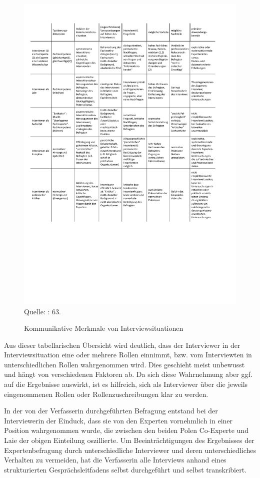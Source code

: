 \begin{figure}[H]
\centering
\caption{Kommunikative Merkmale von Interviewsituationen}
\includegraphics[width=7in,trim=50 220 0 50]{Material/InterviewsituationenDiss}
Quelle: \cite{bogmenz} : 63.
\end{figure}
Aus dieser tabellarischen Übersicht wird deutlich, dass der Interviewer in der Interviewsituation eine oder mehrere Rollen einnimmt, bzw. vom Interviewten in unterschiedlichen Rollen wahrgenommen wird. Dies geschieht meist unbewusst und hängt von verschiedenen Faktoren ab. Da sich diese Wahrnehmung aber ggf. auf die Ergebnisse auswirkt, ist es hilfreich, sich als Interviewer über die jeweils eingenommenen Rollen oder Rollenzuschreibungen klar zu werden. \par
In der von der Verfasserin durchgeführten Befragung entstand bei der Interviewerin der Einduck, dass sie von den Experten vornehmlich in einer Position wahrgenommen wurde, die zwischen den beiden Polen Co-Experte und Laie der obigen Einteilung oszillierte. Um Beeinträchtigungen des Ergebnisses der Expertenbefragung durch unterschiedliche Interviewer und deren unterschiedliches Verhalten zu vermeiden, hat die Verfasserin alle Interviews anhand eines strukturierten Gesprächsleitfadens selbst durchgeführt und selbst transkribiert.\par
